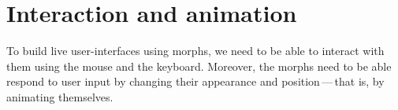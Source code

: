 \documentclass[a4paper,10pt,twoside]{book}
\begin{document}








\section{Interaction and animation}

To build live user-interfaces using morphs, we need to be able to interact with them using the mouse and the keyboard.
Moreover, the morphs need to be able respond to user input by changing their appearance and position\,---\,that is, by animating themselves.
\end{document}
